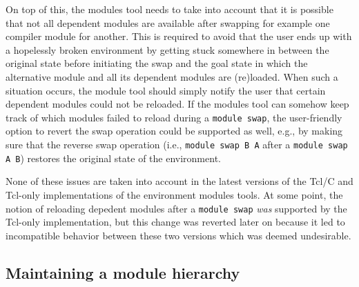 On top of this, the modules tool needs to take into account that it is
possible that not all dependent modules are available after swapping for example
one compiler module for another. This is required to avoid that the user
ends up with a hopelessly broken environment by getting stuck somewhere in
between the original state before initiating the swap and the goal state
in which the alternative module and all its dependent modules are (re)loaded.
When such a situation occurs, the module tool should simply notify the user
that certain dependent modules could not be reloaded. If the modules tool
can somehow keep track of which modules failed to reload during a
\texttt{\small module swap}, the user-friendly option to revert the swap
operation could be supported as well, e.g., by making sure that the reverse
swap operation (i.e., \texttt{\small module swap B A} after a
\texttt{\small module swap A B}) restores the original state of the environment.

None of these issues are taken into account in the latest versions of the
Tcl/C and Tcl-only implementations of the environment modules tools. At some point,
the notion of reloading depedent modules after a \texttt{\small module swap}
\emph{was} supported by the Tcl-only implementation, but this change was
reverted later on because it led to incompatible behavior between
these two versions which was deemed undesirable.




\subsection{Maintaining a module hierarchy}
\label{sec:maintaining_a_hierarchy}

